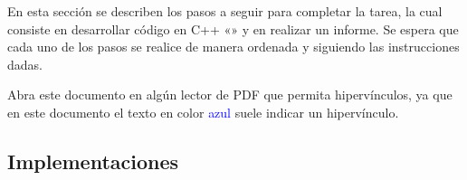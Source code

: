     En esta sección se describen los pasos a seguir para completar la tarea, la cual consiste en desarrollar código
    en C++ «» y en realizar un informe. Se espera que cada
    uno de los pasos se realice de manera ordenada y siguiendo las instrucciones dadas.

    \begin{mdframed}
        Abra este documento en algún lector de PDF que permita hipervínculos, ya que en este documento el texto en
        color \textcolor{blue}{azul} suele indicar un hipervínculo.
    \end{mdframed}

\subsection{Implementaciones} \label{subsec:implementations}

